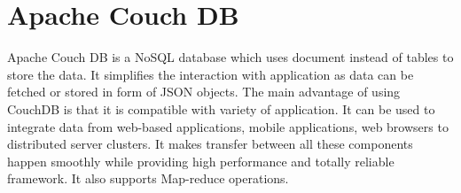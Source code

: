 \section{Apache Couch DB}

Apache Couch DB is a NoSQL database which uses document instead of tables to
store the data. It simplifies the interaction with application as data can be
fetched or stored in form of JSON objects.
The main advantage of using CouchDB is that it is compatible with variety of
application. It can be used to integrate data from web-based applications,
mobile applications, web browsers to distributed server clusters. It makes
transfer between all these components happen smoothly while providing high
performance and totally reliable framework. It also supports Map-reduce
operations. \cite{hid-sp18-502-ApacheCouchDB}

